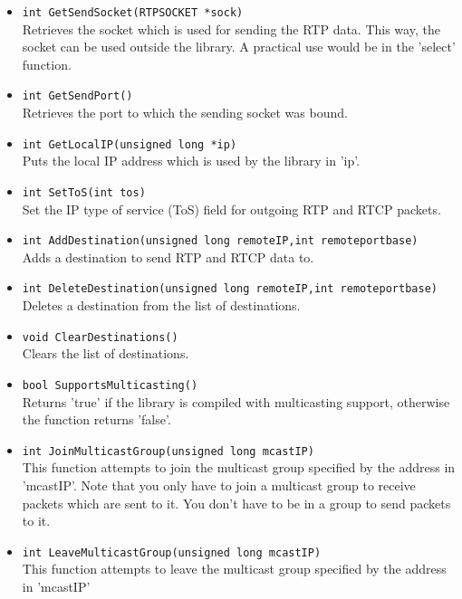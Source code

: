 \begin{itemize}
\item {\tt int GetSendSocket(RTPSOCKET *sock)}\\
	Retrieves the socket which is used for sending the RTP data. This
	way, the socket can be used outside the library. A practical use
	would be in the 'select' function.

\item {\tt int GetSendPort()}\\
	Retrieves the port to which the sending socket was bound.

\item {\tt int GetLocalIP(unsigned long *ip)}\\
 	Puts the local IP address which is used by the library in 'ip'.

\item {\tt int SetToS(int tos)}\\
 	Set the IP type of service (ToS) field for outgoing RTP and RTCP
	packets.
 
\item {\tt int AddDestination(unsigned long remoteIP,int remoteportbase)}\\
 	Adds a destination to send RTP and RTCP data to.

\item {\tt int DeleteDestination(unsigned long remoteIP,int remoteportbase)}\\
	Deletes a destination from the list of destinations.
	
\item {\tt void ClearDestinations()}\\
	Clears the list of destinations.

\item {\tt bool SupportsMulticasting()}\\
	Returns 'true' if the library is compiled with multicasting support,
	otherwise the function returns 'false'.

\item {\tt int JoinMulticastGroup(unsigned long mcastIP)}\\
 	This function attempts to join the multicast group specified by the
 	address in 'mcastIP'. Note that you only have to join a multicast
 	group to receive packets which are sent to it. You don't have to be
 	in a group to send packets to it.

\item {\tt int LeaveMulticastGroup(unsigned long mcastIP)}\\
 	This function attempts to leave the multicast group specified by the
 	address in 'mcastIP'


\end{itemize}
